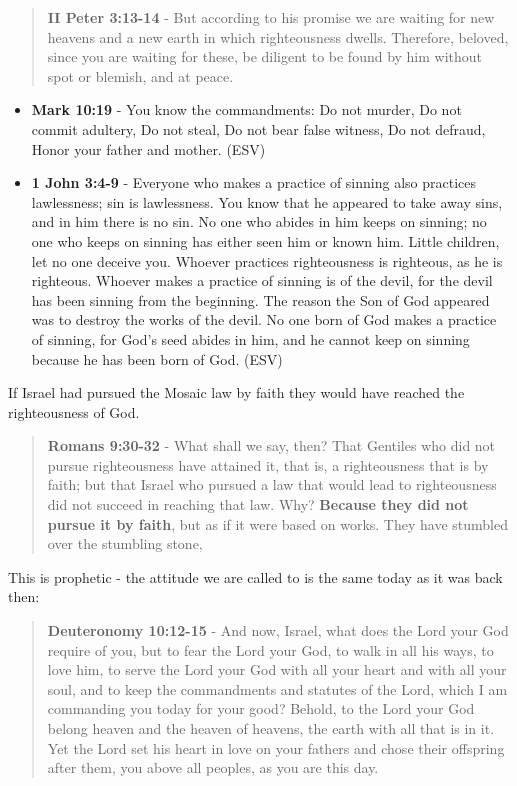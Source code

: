 \documentclass[11pt]{article}
\begin{document}
\begin{quote}
\textbf{II Peter 3:13-14} - But according to his promise we are waiting for new heavens and a new earth in which righteousness dwells. Therefore, beloved, since you are waiting for these, be diligent to be found by him without spot or blemish, and at peace.
\end{quote}

\begin{itemize}
\item \textbf{Mark 10:19} - You know the commandments: Do not murder, Do not commit adultery, Do not steal, Do not bear false witness, Do not defraud, Honor your father and mother. (ESV)
\item \textbf{1 John 3:4-9} - Everyone who makes a practice of sinning also practices lawlessness; sin is lawlessness.  You know that he appeared to take away sins, and in him there is no sin.  No one who abides in him keeps on sinning; no one who keeps on sinning has either seen him or known him.  Little children, let no one deceive you.  Whoever practices righteousness is righteous, as he is righteous.  Whoever makes a practice of sinning is of the devil, for the devil has been sinning from the beginning.  The reason the Son of God appeared was to destroy the works of the devil.  No one born of God makes a practice of sinning, for God's seed abides in him, and he cannot keep on sinning because he has been born of God.  (ESV)
\end{itemize}

If Israel had pursued the Mosaic law by faith they would have reached the righteousness of God.

\begin{quote}
\textbf{Romans 9:30-32} - What shall we say, then? That Gentiles who did not pursue righteousness have attained it, that is, a righteousness that is by faith; but that Israel who pursued a law that would lead to righteousness did not succeed in reaching that law.  Why? \textbf{Because they did not pursue it by faith}, but as if it were based on works. They have stumbled over the stumbling stone,
\end{quote}

This is prophetic - the attitude we are called to is the same today as it was back then:

\begin{quote}
\textbf{Deuteronomy 10:12-15} - And now, Israel, what does the Lord your God require of you, but to fear the Lord your God, to walk in all his ways, to love him, to serve the Lord your God with all your heart and with all your soul, and to keep the commandments and statutes of the Lord, which I am commanding you today for your good? Behold, to the Lord your God belong heaven and the heaven of heavens, the earth with all that is in it. Yet the Lord set his heart in love on your fathers and chose their offspring after them, you above all peoples, as you are this day.
\end{quote}
\end{document}
